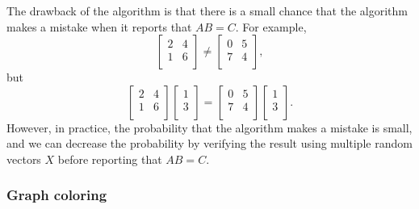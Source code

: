 The drawback of the algorithm is
that there is a small chance that the algorithm
makes a mistake when it reports that $AB=C$.
For example, 
\[
 \begin{bmatrix}
  2 & 4 \\
  1 & 6 \\
 \end{bmatrix}
\neq
 \begin{bmatrix}
  0 & 5 \\
  7 & 4 \\
 \end{bmatrix},
\]
but
\[
 \begin{bmatrix}
  2 & 4 \\
  1 & 6 \\
 \end{bmatrix}
 \begin{bmatrix}
  1 \\
  3 \\
 \end{bmatrix}
=
 \begin{bmatrix}
  0 & 5 \\
  7 & 4 \\
 \end{bmatrix}
 \begin{bmatrix}
  1 \\
  3 \\
 \end{bmatrix}.
\]
However, in practice, the probability that the
algorithm makes a mistake is small,
and we can decrease the probability by
verifying the result using multiple random vectors $X$
before reporting that $AB=C$.

\subsubsection{Graph coloring}


